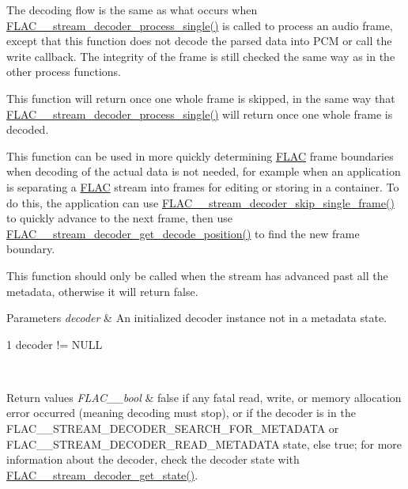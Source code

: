 The decoding flow is the same as what occurs when \hyperlink{group__flac__stream__decoder_ga8c4708eb2c5d99595f64dc2473aa2f42}{F\+L\+A\+C\+\_\+\+\_\+stream\+\_\+decoder\+\_\+process\+\_\+single()} is called to process an audio frame, except that this function does not decode the parsed data into P\+CM or call the write callback. The integrity of the frame is still checked the same way as in the other process functions.

This function will return once one whole frame is skipped, in the same way that \hyperlink{group__flac__stream__decoder_ga8c4708eb2c5d99595f64dc2473aa2f42}{F\+L\+A\+C\+\_\+\+\_\+stream\+\_\+decoder\+\_\+process\+\_\+single()} will return once one whole frame is decoded.

This function can be used in more quickly determining \hyperlink{namespace_f_l_a_c}{F\+L\+AC} frame boundaries when decoding of the actual data is not needed, for example when an application is separating a \hyperlink{namespace_f_l_a_c}{F\+L\+AC} stream into frames for editing or storing in a container. To do this, the application can use \hyperlink{group__flac__stream__decoder_ga371bc2b4f5571e40c47f4db5a8a745f8}{F\+L\+A\+C\+\_\+\+\_\+stream\+\_\+decoder\+\_\+skip\+\_\+single\+\_\+frame()} to quickly advance to the next frame, then use \hyperlink{group__flac__stream__decoder_ga11507d25b6fdbd1efd5ee642923730fa}{F\+L\+A\+C\+\_\+\+\_\+stream\+\_\+decoder\+\_\+get\+\_\+decode\+\_\+position()} to find the new frame boundary.

This function should only be called when the stream has advanced past all the metadata, otherwise it will return {\ttfamily false}.


\begin{DoxyParams}{Parameters}
{\em decoder} & An initialized decoder instance not in a metadata state.  
\begin{DoxyCode}
1 decoder != NULL 
\end{DoxyCode}
 \\
\hline
\end{DoxyParams}

\begin{DoxyRetVals}{Return values}
{\em F\+L\+A\+C\+\_\+\+\_\+bool} & {\ttfamily false} if any fatal read, write, or memory allocation error occurred (meaning decoding must stop), or if the decoder is in the F\+L\+A\+C\+\_\+\+\_\+\+S\+T\+R\+E\+A\+M\+\_\+\+D\+E\+C\+O\+D\+E\+R\+\_\+\+S\+E\+A\+R\+C\+H\+\_\+\+F\+O\+R\+\_\+\+M\+E\+T\+A\+D\+A\+TA or F\+L\+A\+C\+\_\+\+\_\+\+S\+T\+R\+E\+A\+M\+\_\+\+D\+E\+C\+O\+D\+E\+R\+\_\+\+R\+E\+A\+D\+\_\+\+M\+E\+T\+A\+D\+A\+TA state, else {\ttfamily true}; for more information about the decoder, check the decoder state with \hyperlink{group__flac__stream__decoder_ga5899c204ad7183ec04e41855090c0635}{F\+L\+A\+C\+\_\+\+\_\+stream\+\_\+decoder\+\_\+get\+\_\+state()}. \\
\hline
\end{DoxyRetVals}


